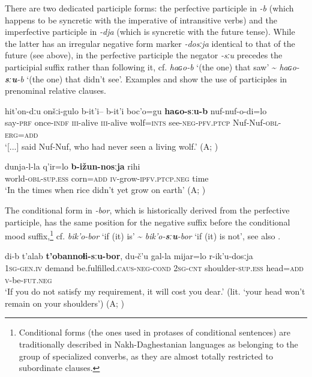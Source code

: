 \documentclass[output=paper,colorlinks=true, citecolor=brown]{langscibook}
\begin{document}
There are two dedicated participle forms: the perfective participle in \textit{{}-b} (which happens to be syncretic with the imperative of intransitive verbs) and the imperfective participle in \textit{\nobreakdash-dja} (which is syncretic with the future tense). While the latter has an irregular negative form marker \textit{{}-dosːja} identical to that of the future (see  above), in the perfective participle the negator \textit{\nobreakdash-sːu} precedes the participial suffix rather than following it, cf. \textit{haɢo-b} ‘(the one) that saw’ {\textasciitilde} \textit{haɢo-}\textbf{\textit{sːu}}\textit{{}-b} ‘(the one) that didn’t see’. Examples  and  show the use of participles in prenominal relative clauses.

\ea
    \label{ex:and:32}
    \gll [...] hit’on{}-dːu {\ob}onšːi{}-gulo b{}-it’i– b{}-it’i boc’o=gu \textbf{haɢo-sːu-b}{\cb} nuf-nuf{}-o{}-di=lo \\
          {} say-\textsc{prf} {\db}once-\textsc{indf} \textsc{iii}{}-alive \textsc{iii}{}-alive wolf=\textsc{ints} see-\textsc{neg-pfv.ptcp} Nuf-Nuf\textsc{{}-obl}{}-\textsc{erg=add} \\
    \glt ‘[...] said Nuf-Nuf, who had never seen a living wolf.’ (A; )
\z 

\ea
    \label{ex:and:33}
    \gll {\ob}dunja{}-l{}-la q’ir=lo \textbf{b{}-ižun{}-nosːja}{\cb} rihi\\
          {\db}world\textsc{{}-obl}{}-\textsc{sup.ess} corn=\textsc{add} \textsc{iv}{}-grow-\textsc{ipfv.ptcp.neg} time \\
    \glt ‘In the times when rice didn’t yet grow on earth’ (A; )
\z 

The conditional form in \textit{{}-bor}, which is historically derived from the perfective participle, has the same position for the negative suffix before the conditional mood suffix,\footnote{Conditional forms (the ones used in protases of conditional sentences) are traditionally described in Nakh-Daghestanian languages as belonging to the group of specialized converbs, as they are almost totally restricted to subordinate clauses.} cf. \textit{bik’o-bor} ‘if (it) is’ {\textasciitilde} \textit{bik’o-}\textbf{\textit{sːu}}\textit{{}-bor} ‘if (it) is not’, see also .

\ea
    \label{ex:and:34} 
    \gll di{}-b t’alab \textbf{t’obannoɬi{}-sːu{}-bor}, du{}-č’u gal{}-la mijar=lo r{}-ik’u{}-dosːja \\
          \textsc{1sg}-\textsc{gen.iv} demand be.fulfilled.\textsc{caus-neg-cond} \textsc{2sg}{}-\textsc{cnt} shoulder-\textsc{sup.ess} head=\textsc{add} \textsc{v}{}-be-\textsc{fut.neg} \\
    \glt ‘If you do not satisfy my requirement, it will cost you dear.’ (lit. ‘your head won’t remain on your shoulders’) (A; )
\z 
\end{document}
